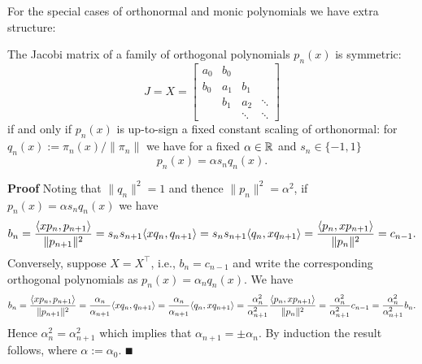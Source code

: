For the special cases of orthonormal and monic polynomials we have extra structure:

\begin{corollary} The Jacobi matrix of a family of orthogonal polynomials $p_n(x)$ is symmetric:
\[
J = X = \begin{bmatrix} a_0 & b_0 \\
                                                        b_0 & a_1 & b_1\\
                                                        & b_1 & a_2 & \ensuremath{\ddots} \\
                                                        && \ensuremath{\ddots} & \ensuremath{\ddots}
                                                        \end{bmatrix}
\]
if and only if $p_n(x)$ is up-to-sign a fixed constant scaling of orthonormal: for $q_n(x) := \ensuremath{\pi}_n(x)/\|\ensuremath{\pi}_n\|$ we have for a fixed $\alpha \in {\mathbb R}$ and $s_n \ensuremath{\in} \{-1,1\}$
\[
p_n(x) = \ensuremath{\alpha} s_n q_n(x).
\]
\end{corollary}
\textbf{Proof} Noting that $\|q_n\|^2 = 1$ and thence $\|p_n\|^2 = \ensuremath{\alpha}^2$, if $p_n(x) = \ensuremath{\alpha} s_n q_n(x)$ we have
\[
b_n = {\ensuremath{\langle}xp_n, p_{n+1}\ensuremath{\rangle} \over \|p_{n+1}\|^2} = s_n s_{n+1} \ensuremath{\langle}x q_n, q_{n+1}\ensuremath{\rangle} =
s_n s_{n+1} \ensuremath{\langle}q_n, x q_{n+1}\ensuremath{\rangle} = {\ensuremath{\langle}p_n, xp_{n+1}\ensuremath{\rangle} \over \|p_n\|^2} = c_{n-1}.
\]
Conversely, suppose $X = X^\ensuremath{\top}$, i.e., $b_n = c_{n-1}$ and write the corresponding orthogonal polynomials as $p_n(x) = \ensuremath{\alpha}_n q_n(x)$. We have
\[
b_n = {\ensuremath{\langle}xp_n, p_{n+1}\ensuremath{\rangle} \over \|p_{n+1}\|^2} =
{\ensuremath{\alpha}_n \over \ensuremath{\alpha}_{n+1}} \ensuremath{\langle}xq_n, q_{n+1}\ensuremath{\rangle} =
{\ensuremath{\alpha}_n \over \ensuremath{\alpha}_{n+1}} \ensuremath{\langle}q_n, x q_{n+1}\ensuremath{\rangle} = {\ensuremath{\alpha}_n^2 \over \ensuremath{\alpha}_{n+1}^2} {\ensuremath{\langle}p_n, xp_{n+1}\ensuremath{\rangle} \over \|p_n\|^2}
= {\ensuremath{\alpha}_n^2 \over \ensuremath{\alpha}_{n+1}^2} c_{n-1} = {\ensuremath{\alpha}_n^2 \over \ensuremath{\alpha}_{n+1}^2} b_n.
\]
Hence $\ensuremath{\alpha}_n^2 = \ensuremath{\alpha}_{n+1}^2$ which implies that $\ensuremath{\alpha}_{n+1} = \ensuremath{\pm} \ensuremath{\alpha}_n$. By induction the result follows, where $\ensuremath{\alpha} := \ensuremath{\alpha}_0$. \ensuremath{\QED}

